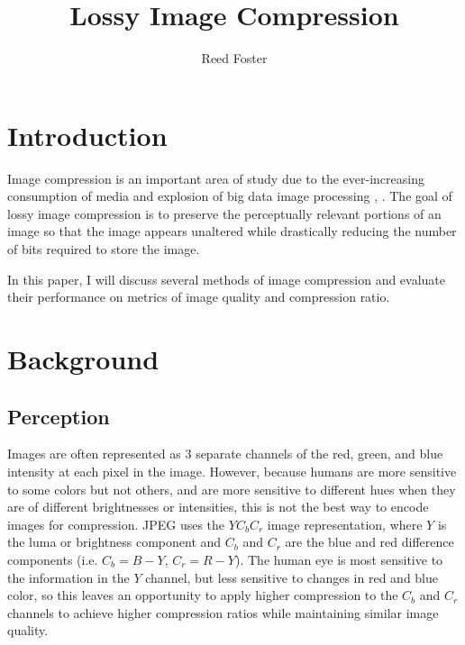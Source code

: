 \documentclass[conference]{IEEEtran}
\begin{document}
\title{Lossy Image Compression}

\author{Reed Foster}

\maketitle

%

\section{Introduction}

Image compression is an important area of study due to the ever-increasing consumption of media and explosion of big data image processing \cite{imgProcessingTinkuAcharya}, \cite{scnn}.
The goal of lossy image compression is to preserve the perceptually relevant portions of an image so that the image appears unaltered while drastically reducing the number of bits required to store the image.

In this paper, I will discuss several methods of image compression and evaluate their performance on metrics of image quality and compression ratio.

\section{Background}

\subsection{Perception}
Images are often represented as 3 separate channels of the red, green, and blue intensity at each pixel in the image.
However, because humans are more sensitive to some colors but not others, and are more sensitive to different hues when they are of different brightnesses or intensities, this is not the best way to encode images for compression.
JPEG uses the $YC_bC_r$ image representation, where $Y$ is the luma or brightness component and $C_b$ and $C_r$ are the blue and red difference components (i.e. $C_b = B - Y$, $C_r = R - Y$).
The human eye is most sensitive to the information in the $Y$ channel, but less sensitive to changes in red and blue color, so this leaves an opportunity to apply higher compression to the $C_b$ and $C_r$ channels to achieve higher compression ratios while maintaining similar image quality.
\end{document}
